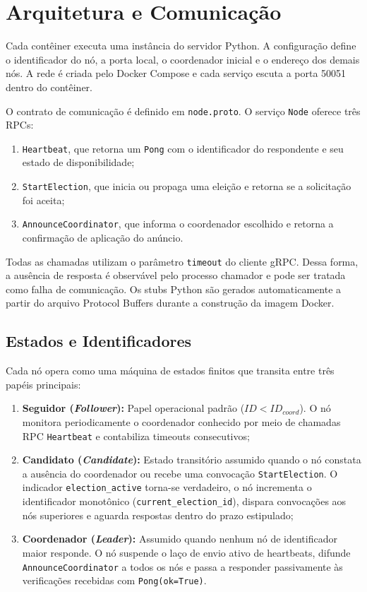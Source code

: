 \section{Arquitetura e Comunicação}
\label{sec:arquitetura}

Cada contêiner executa uma instância do servidor Python. A configuração define
o identificador do nó, a porta local, o coordenador inicial e o endereço dos
demais nós. A rede é criada pelo Docker Compose e cada serviço escuta a porta
50051 dentro do contêiner.

O contrato de comunicação é definido em \texttt{node.proto}. O serviço
\texttt{Node} oferece três RPCs:
\begin{enumerate}
    \item \texttt{Heartbeat}, que retorna um \texttt{Pong} com o identificador
    do respondente e seu estado de disponibilidade;
    \item \texttt{StartElection}, que inicia ou propaga uma eleição e retorna
    se a solicitação foi aceita;
    \item \texttt{AnnounceCoordinator}, que informa o coordenador escolhido e
    retorna a confirmação de aplicação do anúncio.
\end{enumerate}

Todas as chamadas utilizam o parâmetro \texttt{timeout} do cliente gRPC. Dessa
forma, a ausência de resposta é observável pelo processo chamador e pode ser
tratada como falha de comunicação. Os stubs Python são gerados
automaticamente a partir do arquivo Protocol Buffers durante a construção da
imagem Docker.

\subsection{Estados e Identificadores}

Cada nó opera como uma máquina de estados finitos que transita entre três papéis principais:
\begin{enumerate}
    \item \textbf{Seguidor (\textit{Follower}):} Papel operacional padrão ($ID < ID_{coord}$). O nó monitora periodicamente o coordenador conhecido por meio de chamadas RPC \texttt{Heartbeat} e contabiliza timeouts consecutivos;
    \item \textbf{Candidato (\textit{Candidate}):} Estado transitório assumido quando o nó constata a ausência do coordenador ou recebe uma convocação \texttt{StartElection}. O indicador \texttt{election\_active} torna-se verdadeiro, o nó incrementa o identificador monotônico (\texttt{current\_election\_id}), dispara convocações aos nós superiores e aguarda respostas dentro do prazo estipulado;
    \item \textbf{Coordenador (\textit{Leader}):} Assumido quando nenhum nó de identificador maior responde. O nó suspende o laço de envio ativo de heartbeats, difunde \texttt{AnnounceCoordinator} a todos os nós e passa a responder passivamente às verificações recebidas com \texttt{Pong(ok=True)}.
\end{enumerate}

